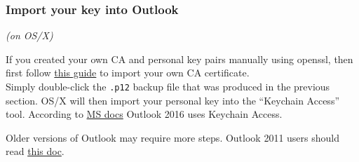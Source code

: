 \documentclass[pdftex,12pt,titlepage=false]{scrartcl}
\begin{document}
\subsubsection{Import your key into Outlook}\label{import}
\begin{minipage}[t]{0.35\textwidth}
  \centerline{\textsl{(on OS/X)}} If you created your own CA and
  personal key pairs manually using openssl, then first follow
  \href{https://www.techrepublic.com/blog/apple-in-the-enterprise/managing-ssl-certificate-authorities-on-os-x/}{%
    this guide} to import your own CA certificate.\\[0.5em]

  Simply double-click the \texttt{.p12} backup file that was produced
  in the previous section.  OS/X will then import your personal key
  into the ``Keychain Access'' tool.  According to
  \href{https://technet.microsoft.com/en-us/library/jj984223(v=office.16).aspx}{MS
    docs} Outlook 2016 uses Keychain Access.

  Older versions of Outlook may require more steps.  Outlook 2011
  users should read
  \href{https://support.microsoft.com/en-us/help/2957671/you-cannot-manage-your-certificates-in-the-mac-os-x-10-9-keychain}{%
    this doc}.
\end{minipage}\hfill%
\end{document}
